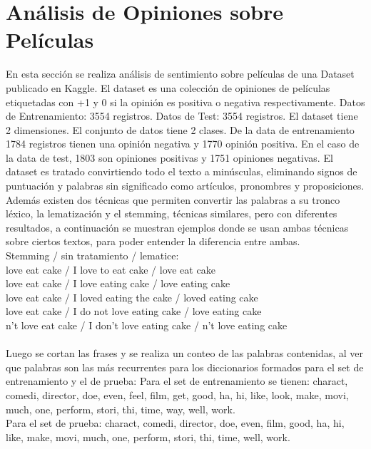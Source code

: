 \documentclass[letter, 10pt]{article}
\begin{document}
\section{Análisis de Opiniones sobre Películas}

En esta sección se realiza análisis de sentimiento sobre películas de una Dataset publicado en Kaggle. El dataset es una colección de opiniones de películas etiquetadas con +1 y 0 si la opinión es positiva o negativa respectivamente. 
Datos de Entrenamiento: 3554 registros.
Datos de Test: 3554 registros.
El dataset tiene 2 dimensiones.
El conjunto de datos tiene 2 clases.
De la data de entrenamiento 1784 registros tienen una opinión negativa y 1770 opinión positiva. En el caso de la data de test, 1803 son opiniones positivas y 1751 opiniones negativas. El dataset es tratado convirtiendo todo el texto a minúsculas, eliminando signos de puntuación y palabras sin significado como artículos, pronombres y proposiciones. Además existen dos técnicas que permiten convertir las palabras a su tronco léxico, la lematización y el stemming, técnicas similares, pero con diferentes resultados, a continuación se muestran ejemplos donde se usan ambas técnicas sobre ciertos textos, para poder entender la diferencia entre ambas.\\

Stemming		/	sin tratamiento		/	lematice:\\
love eat cake		/	I love to eat cake		/	love eat cake\\
love eat cake		/	I love eating cake		/ 	love eating cake\\
love eat cake		/	I loved eating the cake	/	loved eating cake\\
love eat cake		/	I do not love eating cake	/ 	love eating cake\\
n't love eat cake	/	I don't love eating cake	/ 	n't love eating cake\\\\
Luego se cortan las frases y se realiza un conteo de las palabras contenidas, al ver que palabras son las más recurrentes para los diccionarios formados para el set de entrenamiento y el de prueba:
Para el set de entrenamiento se tienen: charact, comedi, director, doe, even, feel, film, get, good, ha, hi, like, look, make, movi, much, one, perform, stori, thi, time, way, well, work.\\

Para el set de prueba: charact, comedi, director, doe, even, film, good, ha, hi, like, make, movi, much, one, perform, stori, thi, time, well, work.\\
\end{document}
